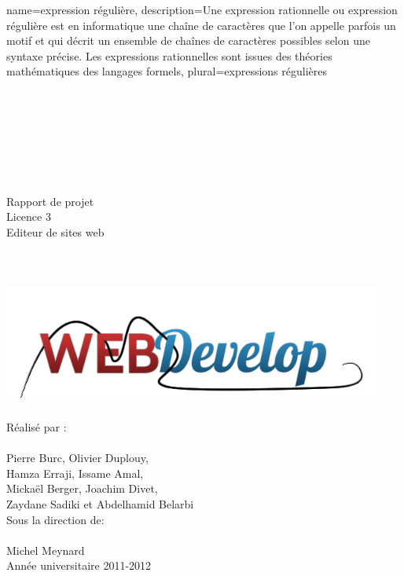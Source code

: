 \documentclass[a4paper, 12pt]{report}
\begin{document}
	{
		name={expression régulière},
		description={Une expression rationnelle ou expression régulière est en informatique une chaîne de caractères que l’on appelle parfois un motif
		et qui décrit un ensemble de chaînes de caractères possibles selon une syntaxe précise.
		Les expressions rationnelles sont issues des théories mathématiques des langages formels},
		plural={expressions régulières}
	}

	\begin{titlepage}
		\\ 
		~\\
		~\\
		~\\
		~\\
		~\\		
		\begin{center}
			{\large Rapport de projet} \\
			{\large Licence 3}\\
			\vspace{1,5cm}
			{\Huge Editeur de sites web}\\
			~\\
			~\\
			~\\
			\includegraphics[width=12.5cm]{images/logoTest1.png}
			~\\
			~\\
			{\large Réalisé par :} \\
			~\\
			{\LARGE Pierre Burc, Olivier Duplouy, \\
				      Hamza Erraji, Issame Amal,\\
				      Mickaël Berger, Joachim Divet,\\
				      Zaydane Sadiki et Abdelhamid Belarbi}\\
			\vspace{1,5cm}
			{\large Sous la direction de:} \\
			~\\
			{\LARGE Michel Meynard} \\
			\vspace{2.5cm}
			{\large Année universitaire 2011-2012 }			
		\end{center}
	\end{titlepage}
\end{document}
